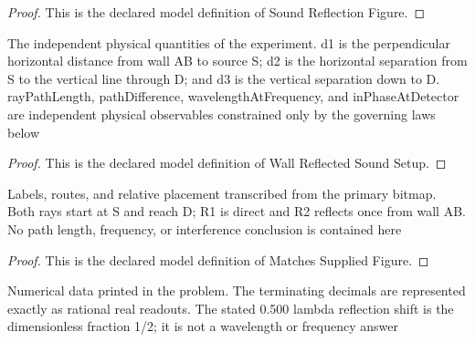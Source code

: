 \begin{proof}
  This is the declared model definition of Sound Reflection Figure.
\end{proof}
\begin{definition}
  \label{def:physics:phyx-mini-0330:phyxminiproblems-problemphyxmini0330-wallreflectedsoundsetup}
  The independent physical quantities of the experiment. d1 is the perpendicular horizontal distance from wall AB to source S; d2 is the horizontal separation from S to the vertical line through D; and d3 is the vertical separation down to D. rayPathLength, pathDifference, wavelengthAtFrequency, and inPhaseAtDetector are independent physical observables constrained only by the governing laws below
\end{definition}
\begin{proof}
  This is the declared model definition of Wall Reflected Sound Setup.
\end{proof}
\begin{definition}
  \label{def:physics:phyx-mini-0330:phyxminiproblems-problemphyxmini0330-matchessuppliedfigure}
  Labels, routes, and relative placement transcribed from the primary bitmap. Both rays start at S and reach D; R1 is direct and R2 reflects once from wall AB. No path length, frequency, or interference conclusion is contained here
\end{definition}
\begin{proof}
  This is the declared model definition of Matches Supplied Figure.
\end{proof}
\begin{definition}
  \label{def:physics:phyx-mini-0330:phyxminiproblems-problemphyxmini0330-matchesproblemreadouts}
  Numerical data printed in the problem. The terminating decimals are represented exactly as rational real readouts. The stated 0.500 lambda reflection shift is the dimensionless fraction 1/2; it is not a wavelength or frequency answer
\end{definition}
